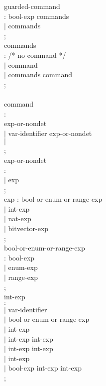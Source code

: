 \begin{tab}
\begin{tabbing}
guarded-command \\
\>: \CHOICE bool-exp \ARROW commands \\
\>$|$ \CHOICE \TTDEFAULT \ARROW commands \\
\>; \\


commands \\
\>: /* no command */ \\
\>$|$ command \\
\>$|$ commands \SEMICOLON command \\
\>; \\
\> \\

command \\
\>: \FORALL \DUMMYID \ARRAYORBITVECID\LSQBRAC\DUMMYID\RSQBRAC \\
\>\> \ASSIGN exp-or-nondet  \\
\>$|$ var-identifier \ASSIGN exp-or-nondet \\
\>$|$ \EVENTSEND \\
\>; \\

exp-or-nondet \\
\>: \TTNONDET  \\
\>$|$ exp \\
\>; \\


exp
\>: bool-or-enum-or-range-exp  \\
\>$|$ int-exp \\
\>$|$ nat-exp  \\
\>$|$ bitvector-exp  \\
\>; \\


bool-or-enum-or-range-exp \\
\>: bool-exp  \\
\>$|$ enum-exp \\
\>$|$ range-exp  \\
\>; \\

int-exp \\
\>$:$ \NATNUM  \\
\>$|$ var-identifier \\
\>$|$ \ARRAYORBITVECID\LSQBRAC bool-or-enum-or-range-exp \RSQBRAC  \\
\>$|$ \LPARA int-exp \RPARA \\
\>$|$ int-exp \PLUS int-exp \\
\>$|$ int-exp \MINUS int-exp \\
\>$|$ \MINUS int-exp \\
\>$|$ \IF bool-exp \THEN int-exp \ELSE int-exp \FI \\
\>; \\



\end{tabbing}
\end{tab}
